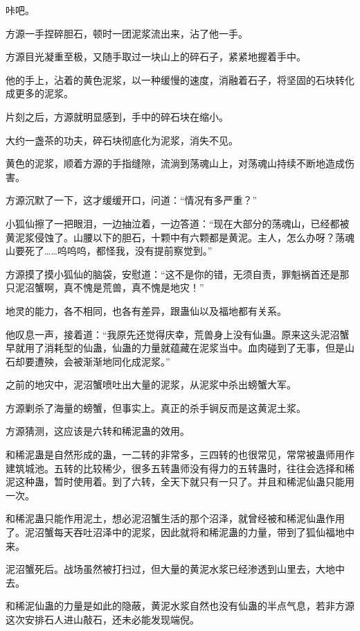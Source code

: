 
\begin{this_body}

咔吧。

方源一手捏碎胆石，顿时一团泥浆流出来，沾了他一手。

方源目光凝重至极，又随手取过一块山上的碎石子，紧紧地握着手中。

他的手上，沾着的黄色泥浆，以一种缓慢的速度，消融着石子，将坚固的石块转化成更多的泥浆。

片刻之后，方源就明显感到，手中的碎石块在缩小。

大约一盏茶的功夫，碎石块彻底化为泥浆，消失不见。

黄色的泥浆，顺着方源的手指缝隙，流淌到荡魂山上，对荡魂山持续不断地造成伤害。

方源沉默了一下，这才缓缓开口，问道：“情况有多严重？”

小狐仙擦了一把眼泪，一边抽泣着，一边答道：“现在大部分的荡魂山，已经都被黄泥浆侵蚀了。山腰以下的胆石，十颗中有六颗都是黄泥。主人，怎么办呀？荡魂山要死了……呜呜呜，都怪我，没有提前察觉到。”

方源摸了摸小狐仙的脑袋，安慰道：“这不是你的错，无须自责，罪魁祸首还是那只泥沼蟹啊，真不愧是荒兽，真不愧是地灾！”

地灵的能力，各不相同，也各有差异，跟蛊仙以及福地都有关系。

他叹息一声，接着道：“我原先还觉得庆幸，荒兽身上没有仙蛊。原来这头泥沼蟹早就用了消耗型的仙蛊，仙蛊的力量就蕴藏在泥浆当中。血肉碰到了无事，但是山石却要遭殃，会被渐渐地同化成泥浆。”

之前的地灾中，泥沼蟹喷吐出大量的泥浆，从泥浆中杀出螃蟹大军。

方源剿杀了海量的螃蟹，但事实上。真正的杀手锏反而是这黄泥土浆。

方源猜测，这应该是六转和稀泥蛊的效用。

和稀泥蛊是自然形成的蛊，一二转的非常多，三四转的也很常见，常常被蛊师用作建筑城池。五转的比较稀少，很多五转蛊师没有得力的五转蛊时，往往会选择和稀泥这种蛊，暂时使用着。到了六转，全天下就只有一只了。并且和稀泥仙蛊只能用一次。

和稀泥蛊只能作用泥土，想必泥沼蟹生活的那个沼泽，就曾经被和稀泥仙蛊作用了。泥沼蟹每天吞吐沼泽中的泥浆，因此就将和稀泥蛊的力量，带到了狐仙福地中来。

泥沼蟹死后。战场虽然被打扫过，但大量的黄泥水浆已经渗透到山里去，大地中去。

和稀泥仙蛊的力量是如此的隐蔽，黄泥水浆自然也没有仙蛊的半点气息，若非方源这次安排石人进山敲石，还未必能发现端倪。


\end{this_body}
